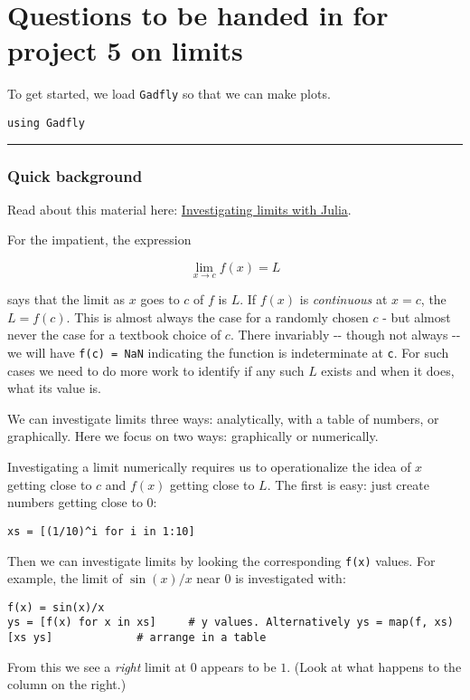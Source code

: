 \documentclass[12pt]{article}
\begin{document}
\section{Questions to be handed in for project 5 on limits}

To get started, we load \texttt{Gadfly} so that we can make plots.



\begin{verbatim}
using Gadfly        
\end{verbatim}
\begin{center}\rule{3in}{0.4pt}\end{center}

\subsubsection{Quick background}

Read about this material here:
\href{http://mth229.github.io/limits.html}{Investigating limits with
Julia}.

For the impatient, the expression

\[
\lim_{x \rightarrow c} f(x) = L
\]

says that the limit as $x$ goes to $c$ of $f$ is $L$. If $f(x)$ is
\emph{continuous} at $x=c$, the $L=f(c)$. This is almost always the case
for a randomly chosen $c$ - but almost never the case for a textbook
choice of $c$. There invariably -{}- though not always -{}- we will have
\texttt{f(c) = NaN} indicating the function is indeterminate at
\texttt{c}. For such cases we need to do more work to identify if any
such $L$ exists and when it does, what its value is.

We can investigate limits three ways: analytically, with a table of
numbers, or graphically. Here we focus on two ways: graphically or
numerically.

Investigating a limit numerically requires us to operationalize the idea
of $x$ getting close to $c$ and $f(x)$ getting close to $L$. The first
is easy: just create numbers getting close to 0:



\begin{verbatim}
xs = [(1/10)^i for i in 1:10]
\end{verbatim}
Then we can investigate limits by looking the corresponding
\texttt{f(x)} values. For example, the limit of $\sin(x)/x$ near $0$ is
investigated with:



\begin{verbatim}
f(x) = sin(x)/x
ys = [f(x) for x in xs]     # y values. Alternatively ys = map(f, xs)
[xs ys]             # arrange in a table
\end{verbatim}
From this we see a \emph{right} limit at 0 appears to be $1$. (Look at
what happens to the column on the right.)
\end{document}
